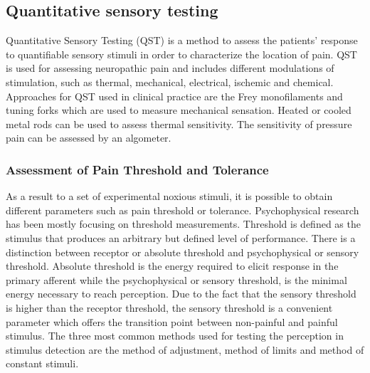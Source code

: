\subsection{Quantitative sensory testing}
Quantitative Sensory Testing (QST) is a method to assess the patients' response to quantifiable sensory stimuli in order to characterize the location of pain. QST is used for assessing neuropathic pain and includes different modulations of stimulation, such as thermal, mechanical, electrical, ischemic and chemical. %
Approaches for QST used in clinical practice are the Frey monofilaments and tuning forks which are used to measure mechanical sensation. Heated or cooled metal rods can be used to assess thermal sensitivity. The sensitivity of pressure pain can be assessed by an algometer. \cite{Fillingim2016}


\subsubsection{Assessment of Pain Threshold and Tolerance}\label{sec:AoPT}

As a result to a set of experimental noxious stimuli, it is possible to obtain different parameters such as pain threshold or tolerance. 
Psychophysical research has been mostly focusing on threshold measurements. \cite{Pelli2010}
Threshold is defined as the stimulus that produces an arbitrary but defined level of performance. There is a distinction between receptor or absolute threshold and psychophysical or sensory threshold. Absolute threshold is the energy required to elicit response in the primary afferent while the psychophysical or sensory threshold, is the minimal energy necessary to reach perception. Due to the fact that the sensory threshold is higher than the receptor threshold,  the sensory threshold is a convenient parameter which offers the transition point between non-painful and painful stimulus. \cite{Yarnitsky2006} %
The three most common methods used for testing the perception in stimulus detection are the method of adjustment, method of limits and method of constant stimuli.


